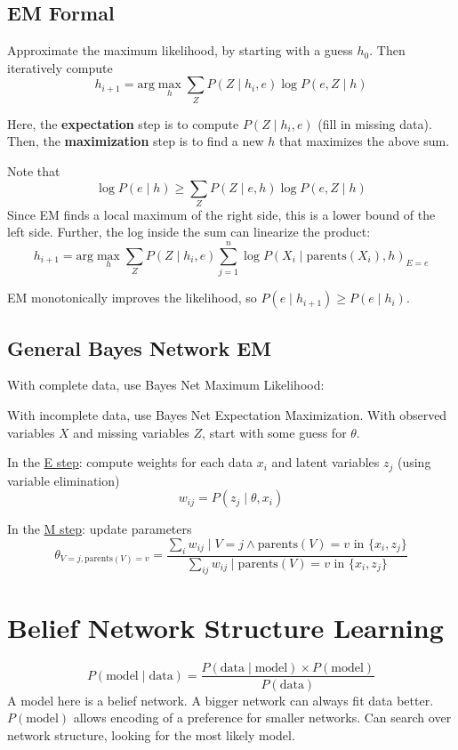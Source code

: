 \documentclass[11pt]{article}
\begin{document}
\subsection{EM Formal}
\label{sec:orgf8c7402}
Approximate the maximum likelihood, by starting with a guess \(h_{0}\).
Then iteratively compute
$$ h_{i+1} = \text{arg} \max_{h} \sum_{Z} P(Z \mid h_{i}, e) \log P(e, Z \mid h) $$

Here, the \textbf{expectation} step is to compute \(P(Z \mid h_{i}, e)\) (fill in missing data).
Then, the \textbf{maximization} step is to find a new \(h\) that maximizes the above sum.

Note that
$$ \log P(e \mid h) \ge \sum_{Z} P(Z \mid e, h) \log P(e, Z \mid h) $$
Since EM finds a local maximum of the right side, this is a lower bound of the left side.
Further, the log inside the sum can linearize the product:
$$ h_{i+1} = \text{arg} \max_{h} \sum_{Z} P(Z \mid h_{i}, e) \sum_{j=1}^{n} \log P(X_{i} \mid \text{parents}(X_{i}), h)_{E = e} $$

EM monotonically improves the likelihood, so \(P(e \mid h_{i+1}) \ge P(e \mid h_{i})\).
\subsection{General Bayes Network EM}
\label{sec:org04beb9c}
With complete data, use Bayes Net Maximum Likelihood:

With incomplete data, use Bayes Net Expectation Maximization.
With observed variables \(X\) and missing variables \(Z\),
start with some guess for \(\theta\).

In the \uline{E step}: compute weights for each data \(x_{i}\) and latent variables \(z_{j}\)
(using variable elimination)
$$ w_{ij} = P(z_{j} \mid \theta, x_{i}) $$

In the \uline{M step}: update parameters
$$ \theta_{V = j, \text{parents}(V) = v} = \frac{\sum_{i} w_{ij} \mid V = j \wedge \text{parents}(V) = v \text{ in } \{x_{i}, z_{j}\}}{\sum_{ij} w_{ij} \mid \text{parents}(V) = v \text{ in } \{x_{i}, z_{j}\}} $$
\section{Belief Network Structure Learning}
\label{sec:orgd7b64e3}
$$ P(\text{model} \mid \text{data}) = \frac{P(\text{data} \mid \text{model}) \times P(\text{model})}{P(\text{data})} $$
A model here is a belief network.
A bigger network can always fit data better.
\(P(\text{model})\) allows encoding of a preference for smaller networks.
Can search over network structure, looking for the most likely model.
\end{document}
